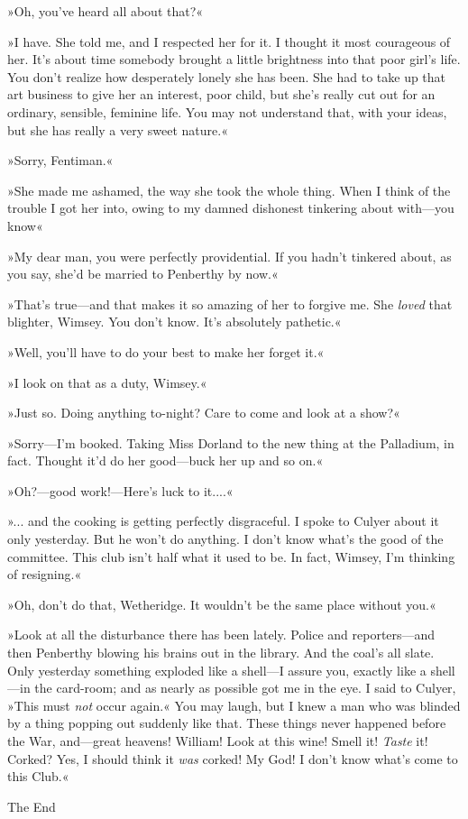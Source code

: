 »Oh, you've heard all about that?«

»I have. She told me, and I respected her for it. I thought it most courageous of her. It's about time somebody brought a little brightness into that poor girl's life. You don't realize how desperately lonely she has been. She had to take up that art business to give her an interest, poor child, but she's really cut out for an ordinary, sensible, feminine life. You may not understand that, with your ideas, but she has really a very sweet nature.«

»Sorry, Fentiman.«

»She made me ashamed, the way she took the whole thing. When I think of the trouble I got her into, owing to my damned dishonest tinkering about with—you know\longdash«

»My dear man, you were perfectly providential. If you hadn't tinkered about, as you say, she'd be married to Penberthy by now.«

»That's true—and that makes it so amazing of her to forgive me. She \textit{loved} that blighter, Wimsey. You don't know. It's absolutely pathetic.«

»Well, you'll have to do your best to make her forget it.«

»I look on that as a duty, Wimsey.«

»Just so. Doing anything to-night? Care to come and look at a show?«

»Sorry—I'm booked. Taking Miss Dorland to the new thing at the Palladium, in fact. Thought it'd do her good—buck her up and so on.«

»Oh?—good work!—Here's luck to it....«

»... and the cooking is getting perfectly disgraceful. I spoke to Culyer about it only yesterday. But he won't do anything. I don't know what's the good of the committee. This club isn't half what it used to be. In fact, Wimsey, I'm thinking of resigning.«

»Oh, don't do that, Wetheridge. It wouldn't be the same place without you.«

»Look at all the disturbance there has been lately. Police and reporters—and then Penberthy blowing his brains out in the library. And the coal's all slate. Only yesterday something exploded like a shell—I assure you, exactly like a shell—in the card-room; and as nearly as possible got me in the eye. I said to Culyer, »This must \textit{not} occur again.« You may laugh, but I knew a man who was blinded by a thing popping out suddenly like that. These things never happened before the War, and—great heavens! William! Look at this wine! Smell it! \textit{Taste} it! Corked? Yes, I should think it \textit{was} corked! My God! I don't know what's come to this Club.«
\vfill
\begin{center}
{\mytitlefont\moderatelyhuge The End}
\end{center}